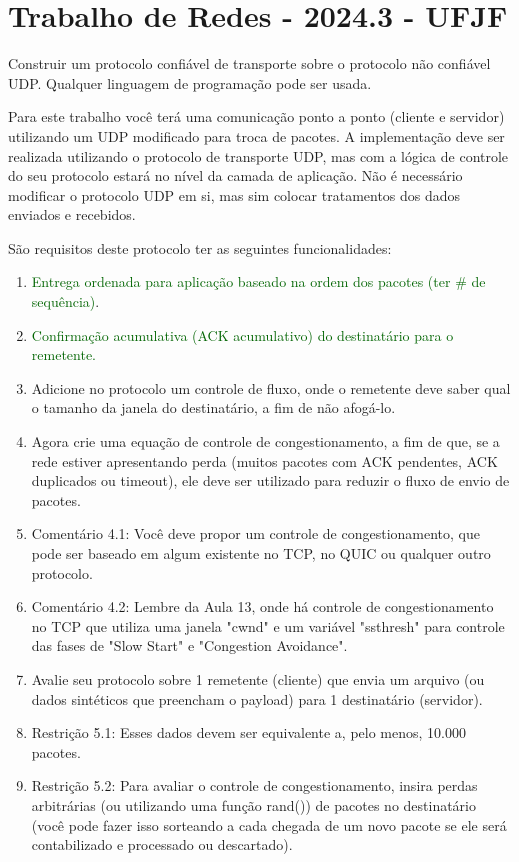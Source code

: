 \documentclass[12pt]{article}
\begin{document}
\section*{Trabalho de Redes - 2024.3 - UFJF}

Construir um protocolo confiável de transporte sobre o protocolo não confiável UDP. Qualquer linguagem de programação pode ser usada.

\vspace{2em}

Para este trabalho você terá uma comunicação ponto a ponto (cliente e servidor) utilizando um UDP modificado para troca de pacotes. A implementação deve ser realizada utilizando o protocolo de transporte UDP, mas com a lógica de controle do seu protocolo estará no nível da camada de aplicação. Não é necessário modificar o protocolo UDP em si, mas sim colocar tratamentos dos dados enviados e recebidos.

São requisitos deste protocolo ter as seguintes funcionalidades:

\begin{enumerate}
    \item \textcolor{darkgreen}{Entrega ordenada para aplicação baseado na ordem dos pacotes (ter \# de sequência)}.
    \item \textcolor{darkgreen}{Confirmação acumulativa (ACK acumulativo) do destinatário para o remetente.}
    \item Adicione no protocolo um controle de fluxo, onde o remetente deve saber qual o tamanho da janela do destinatário, a fim de não afogá-lo.
    \item Agora crie uma equação de controle de congestionamento, a fim de que, se a rede estiver apresentando perda (muitos pacotes com ACK pendentes, ACK duplicados ou timeout), ele deve ser utilizado para reduzir o fluxo de envio de pacotes. 
    \item Comentário 4.1: Você deve propor um controle de congestionamento, que pode ser baseado em algum existente no TCP, no QUIC ou qualquer outro protocolo. 
    \item Comentário 4.2: Lembre da Aula 13, onde há controle de congestionamento no TCP que utiliza uma janela "cwnd" e um variável "ssthresh" para controle das fases de "Slow Start" e "Congestion Avoidance".
    \item Avalie seu protocolo sobre 1 remetente (cliente) que envia um arquivo (ou dados sintéticos que preencham o payload) para 1 destinatário (servidor). 
    \item Restrição 5.1: Esses dados devem ser equivalente a, pelo menos, 10.000 pacotes. 
    \item Restrição 5.2: Para avaliar o controle de congestionamento, insira perdas arbitrárias (ou utilizando uma função rand()) de pacotes no destinatário (você pode fazer isso sorteando a cada chegada de um novo pacote se ele será contabilizado e processado ou descartado).
\end{enumerate}
\end{document}
